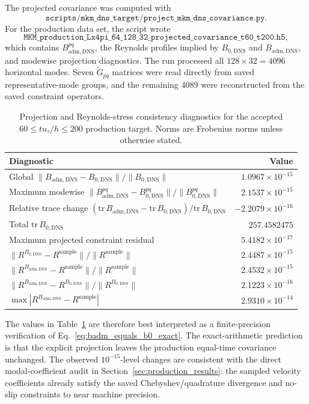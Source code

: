 \documentclass[11pt]{article}
\newcommand{\Gtilde}{\widetilde{G}}
\newcommand{\Bzero}{B_{0,\mathrm{DNS}}}
\newcommand{\Badm}{B_{\mathrm{adm},\mathrm{DNS}}}
\begin{document}
The projected covariance was computed with
\[
  \texttt{scripts/mkm\_dns\_target/project\_mkm\_dns\_covariance.py}.
\]
For the production data set, the script wrote
\[
  \texttt{MKM\_production\_Lx4pi\_64\_128\_32\_projected\_covariance\_t60\_t200.h5},
\]
which contains \(\Badm^{pq}\), the Reynolds profiles implied by
\(\Bzero\) and \(\Badm\), and modewise projection diagnostics. The run
processed all \(128\times32=4096\) horizontal modes. Seven \(\Gtilde_{pq}\)
matrices were read directly from saved representative-mode groups, and the
remaining 4089 were reconstructed from the saved constraint operators.

\begin{table}[H]
  \centering
  \caption{Projection and Reynolds-stress consistency diagnostics for the
  accepted \(60\le t u_{\tau}/h\le200\) production target. Norms are Frobenius
  norms unless otherwise stated.}
  \label{tab:projected_covariance_diagnostics}
  \begin{tabular}{lr}
    \toprule
    Diagnostic & Value \\
    \midrule
    Global \(\|\Badm-\Bzero\|/\|\Bzero\|\) & \(1.0967\times10^{-15}\) \\
    Maximum modewise \(\|\Badm^{pq}-\Bzero^{pq}\|/\|\Bzero^{pq}\|\) & \(2.1537\times10^{-15}\) \\
    Relative trace change \((\mathrm{tr}\,\Badm-\mathrm{tr}\,\Bzero)/\mathrm{tr}\,\Bzero\) & \(-2.2079\times10^{-16}\) \\
    Total \(\mathrm{tr}\,\Bzero\) & \(257.4582475\) \\
    Maximum projected constraint residual & \(5.4182\times10^{-17}\) \\
    \(\|R^{\Bzero}-R^{\mathrm{sample}}\|/\|R^{\mathrm{sample}}\|\) & \(2.4487\times10^{-15}\) \\
    \(\|R^{\Badm}-R^{\mathrm{sample}}\|/\|R^{\mathrm{sample}}\|\) & \(2.4532\times10^{-15}\) \\
    \(\|R^{\Badm}-R^{\Bzero}\|/\|R^{\Bzero}\|\) & \(2.1223\times10^{-16}\) \\
    \(\max |R^{\Badm}-R^{\mathrm{sample}}|\) & \(2.9310\times10^{-14}\) \\
    \bottomrule
  \end{tabular}
\end{table}

The values in Table~\ref{tab:projected_covariance_diagnostics} are therefore
best interpreted as a finite-precision verification of
Eq.~\eqref{eq:badm_equals_b0_exact}. The exact-arithmetic prediction is that
the explicit projection leaves the production equal-time covariance unchanged.
The observed \(10^{-15}\)-level changes are consistent with the direct
modal-coefficient audit in Section~\ref{sec:production_results}: the sampled
velocity coefficients already satisfy the saved Chebyshev/quadrature
divergence and no-slip constraints to near machine precision.
\end{document}
